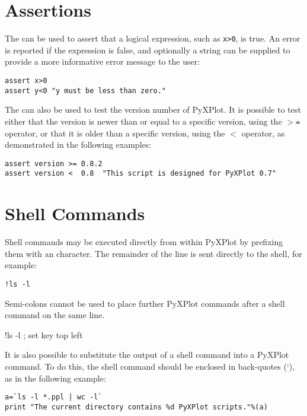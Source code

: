\section{Assertions}

The  can be used to assert that a logical expression, such as
{\tt x>0}, is true. An error is reported if the expression is false, and
optionally a string can be supplied to provide a more informative error message
to the user:

\begin{verbatim}
assert x>0
assert y<0 "y must be less than zero."
\end{verbatim}

The  can also be used to test the version number of PyXPlot. It
is possible to test either that the version is newer than or equal to a
specific version, using the {\tt $>$=} operator, or that it is older than a
specific version, using the {\tt $<$} operator, as demonstrated in the
following examples:

\begin{verbatim}
assert version >= 0.8.2
assert version <  0.8  "This script is designed for PyXPlot 0.7"
\end{verbatim}


\section{Shell Commands}

Shell commands may be executed directly from
within PyXPlot by prefixing them with an \indcmdts{!} character. The
remainder of the line is sent directly to the shell, for example:

\begin{verbatim}
!ls -l
\end{verbatim}

\noindent Semi-colons cannot be used to place further PyXPlot commands after a
shell command on the same line.

\begin{dontdo}
!ls -l ; set key top left
\end{dontdo}

It is also possible to substitute the output of a shell command into a PyXPlot
command. To do this, the shell command should be enclosed in back-quotes (`),
as in the following example:

\begin{verbatim}
a=`ls -l *.ppl | wc -l`
print "The current directory contains %d PyXPlot scripts."%(a)
\end{verbatim}

